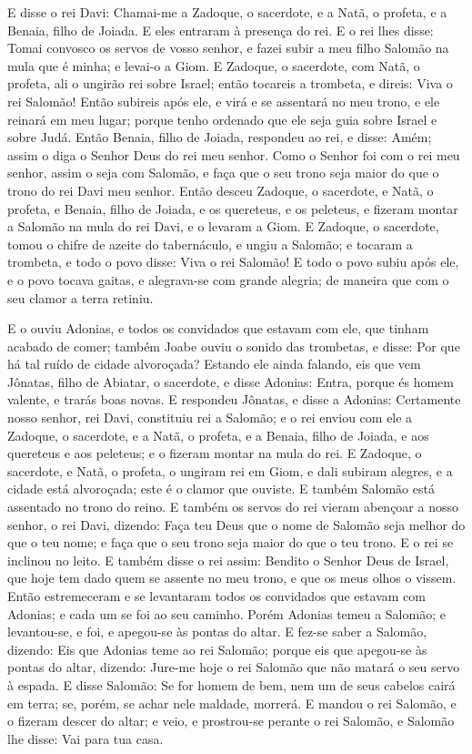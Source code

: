 E disse o rei Davi: Chamai-me a Zadoque, o sacerdote, e a Natã, o
profeta, e a Benaia, filho de Joiada. E eles entraram à presença do
rei. E o rei lhes disse: Tomai convosco os servos de vosso
senhor, e fazei subir a meu filho Salomão na mula que é minha; e
levai-o a Giom. E Zadoque, o sacerdote, com Natã, o profeta,
ali o ungirão rei sobre Israel; então tocareis a trombeta, e direis:
Viva o rei Salomão! Então subireis após ele, e virá e se
assentará no meu trono, e ele reinará em meu lugar; porque tenho
ordenado que ele seja guia sobre Israel e sobre Judá. Então
Benaia, filho de Joiada, respondeu ao rei, e disse: Amém; assim o
diga o Senhor Deus do rei meu senhor. Como o Senhor foi com o
rei meu senhor, assim o seja com Salomão, e faça que o seu trono
seja maior do que o trono do rei Davi meu senhor. Então
desceu Zadoque, o sacerdote, e Natã, o profeta, e Benaia, filho de
Joiada, e os quereteus, e os peleteus, e fizeram montar a Salomão na
mula do rei Davi, e o levaram a Giom. E Zadoque, o sacerdote,
tomou o chifre de azeite do tabernáculo, e ungiu a Salomão; e
tocaram a trombeta, e todo o povo disse: Viva o rei Salomão!
E todo o povo subiu após ele, e o povo tocava gaitas, e
alegrava-se com grande alegria; de maneira que com o seu clamor a
terra retiniu.

E o ouviu Adonias, e todos os convidados que estavam com ele, que
tinham acabado de comer; também Joabe ouviu o sonido das trombetas,
e disse: Por que há tal ruído de cidade alvoroçada? Estando
ele ainda falando, eis que vem Jônatas, filho de Abiatar, o
sacerdote, e disse Adonias: Entra, porque és homem valente, e trarás
boas novas. E respondeu Jônatas, e disse a Adonias:
Certamente nosso senhor, rei Davi, constituiu rei a Salomão;
e o rei enviou com ele a Zadoque, o sacerdote, e a Natã, o
profeta, e a Benaia, filho de Joiada, e aos quereteus e aos
peleteus; e o fizeram montar na mula do rei. E Zadoque, o
sacerdote, e Natã, o profeta, o ungiram rei em Giom, e dali subiram
alegres, e a cidade está alvoroçada; este é o clamor que ouviste.
E também Salomão está assentado no trono do reino. E
também os servos do rei vieram abençoar a nosso senhor, o rei Davi,
dizendo: Faça teu Deus que o nome de Salomão seja melhor do que o
teu nome; e faça que o seu trono seja maior do que o teu trono. E o
rei se inclinou no leito. E também disse o rei assim: Bendito
o Senhor Deus de Israel, que hoje tem dado quem se assente no meu
trono, e que os meus olhos o vissem. Então estremeceram e se
levantaram todos os convidados que estavam com Adonias; e cada um se
foi ao seu caminho. Porém Adonias temeu a Salomão; e
levantou-se, e foi, e apegou-se às pontas do altar. E fez-se
saber a Salomão, dizendo: Eis que Adonias teme ao rei Salomão;
porque eis que apegou-se às pontas do altar, dizendo: Jure-me hoje o
rei Salomão que não matará o seu servo à espada. E disse
Salomão: Se for homem de bem, nem um de seus cabelos cairá em terra;
se, porém, se achar nele maldade, morrerá. E mandou o rei
Salomão, e o fizeram descer do altar; e veio, e prostrou-se perante
o rei Salomão, e Salomão lhe disse: Vai para tua casa.

